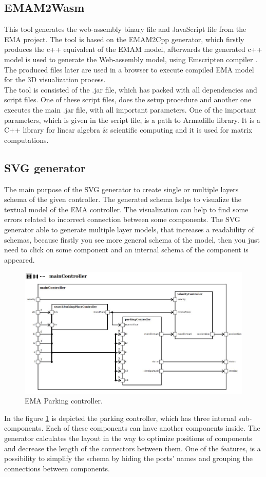 \subsection{EMAM2Wasm} \label{sec:emam2wasm}
This tool generates the web-assembly binary file and JavaScript file from the EMA project. The tool is based on the EMAM2Cpp generator, which firstly produces the c++ equivalent of the EMAM model, afterwards the generated c++ model is used to generate the Web-assembly model, using Emscripten compiler \cite{Emscripten}. The produced files later are used in a browser to execute compiled EMA model for the 3D visualization process. \\
The tool is consisted of the .jar file, which has packed with all dependencies and script files. One of these script files, does the setup procedure and another one executes the main .jar file, with all important parameters. One of the important parameters, which is given in the script file, is a path to Armadillo \cite{Armadillo} library. It is a C++ library for linear algebra \& scientific computing and it is used for matrix computations.
\subsection{SVG generator} \label{sec:svggen}
The main purpose of the SVG generator to create single or multiple layers schema of the given controller. The generated schema helps to visualize the textual model of the EMA controller. The visualization can help to find some errors related to incorrect connection between some components. The SVG generator able to generate multiple layer models, that increases a readability of schemas, because firstly you see more general schema of the model, then you just need to click on some component and an internal schema of the component is appeared.
\begin{figure}[h!]
    \centering
    \includegraphics[width=\linewidth]{src/pic/controller03}
    \caption{EMA Parking controller.}
    \label{fig:parkingCtrl}
\end{figure}
In the figure \ref{fig:parkingCtrl} is depicted the parking controller, which has three internal sub-components. Each of these components can have another components inside. The generator calculates the layout in the way to optimize positions of components and decrease the length of the connectors between them. One of the features, is a possibility to simplify the schema by hiding the ports' names and grouping the connections between components.
